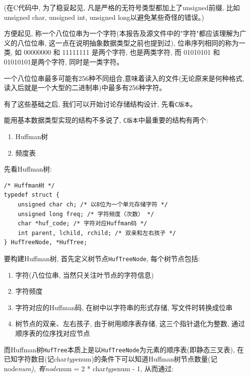 \documentclass{ctexart}
\begin{document}
(在C代码中, 为了稳妥起见, 凡是严格的无符号类型都加上了unsigned前缀, 比如unsigned char, unsigned int, unsigned long以避免某些奇怪的错误。)

方便起见, 称一个八位位串为一个字符(本报告及源文件中的"字符"都应该理解为广义的八位位串, 这一点在说明抽象数据类型之前也提到过), 位串序列相同的称为一类, 如 00000000 和 11111111 是两个字符, 也是两类字符, 而 01010101 和 01010101是两个字符, 同时是一类字符。

一个八位位串最多可能有256种不同组合,意味着读入的文件(无论原来是何种格式, 读入后就是一个大型的二进制串)中最多有256种字符。

有了这些基础之后, 我们可以开始讨论存储结构设计, 先看\texttt{C版本}。

能用基本数据类型实现的结构不多说了, \texttt{C版本}中最重要的结构有两个:

\begin{enumerate}
\def\labelenumi{\arabic{enumi}.}
\item
  Huffman树
\item
  频度表
\end{enumerate}

先看Huffman树:

{\setmainfont{Courier New Bold}              
\begin{lstlisting}
/* Huffman树 */
typedef struct {
    unsigned char ch; /* 以8位为一个单元存储字符 */
    unsigned long freq; /* 字符频度（次数） */
    char *huf_code; /* 字符对应Huffman码 */
    int parent, lchild, rchild; /* 双亲和左右孩子 */
} HufTreeNode, *HufTree;
\end{lstlisting}}

要构建Huffman树, 首先定义树节点\texttt{HufTreeNode}, 每个树节点包括:

\begin{enumerate}
\def\labelenumi{\arabic{enumi}.}
\item
  字符(八位位串, 当然只关注叶节点的字符信息)
\item
  字符频度
\item
  字符对应的Huffman码, 在树中以字符串的形式存储, 写文件时转换成位串
\item
  树节点的双亲、左右孩子, 由于树用顺序表存储, 这三个指针退化为整数, 通过顺序表的位序找对应节点
\end{enumerate}

而Huffman树\texttt{HufTree}本质上是以\texttt{HufTreeNode}为元素的顺序表(即静态三叉表), 在已知字符数目(记char\emph{type}num)的条件下可以知道Huffman树节点数量(记node\emph{num), 有node}num = 2 * char\emph{type}num - 1, 从而通过:
\end{document}
